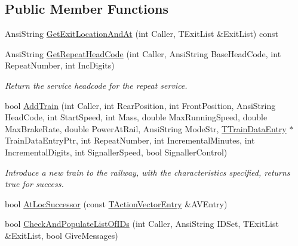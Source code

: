 \subsection*{Public Member Functions}
\begin{DoxyCompactItemize}
\item 
Ansi\+String \mbox{\hyperlink{class_t_train_controller_ae6c904f201d8bb23b3c0714226244890}{Get\+Exit\+Location\+And\+At}} (int Caller, T\+Exit\+List \&Exit\+List) const
\item 
\mbox{\label{class_t_train_controller_afb0e8fd36435809350cb323ab9fe2213}} 
Ansi\+String \mbox{\hyperlink{class_t_train_controller_afb0e8fd36435809350cb323ab9fe2213}{Get\+Repeat\+Head\+Code}} (int Caller, Ansi\+String Base\+Head\+Code, int Repeat\+Number, int Inc\+Digits)
\begin{DoxyCompactList}\small\item\em Return the service headcode for the repeat service. \end{DoxyCompactList}\item 
\mbox{\label{class_t_train_controller_ae9b32534ac7db1c3b0965fc375834132}} 
bool \mbox{\hyperlink{class_t_train_controller_ae9b32534ac7db1c3b0965fc375834132}{Add\+Train}} (int Caller, int Rear\+Position, int Front\+Position, Ansi\+String Head\+Code, int Start\+Speed, int Mass, double Max\+Running\+Speed, double Max\+Brake\+Rate, double Power\+At\+Rail, Ansi\+String Mode\+Str, \mbox{\hyperlink{class_t_train_data_entry}{T\+Train\+Data\+Entry}} $\ast$Train\+Data\+Entry\+Ptr, int Repeat\+Number, int Incremental\+Minutes, int Incremental\+Digits, int Signaller\+Speed, bool Signaller\+Control)
\begin{DoxyCompactList}\small\item\em Introduce a new train to the railway, with the characteristics specified, returns true for success. \end{DoxyCompactList}\item 
bool \mbox{\hyperlink{class_t_train_controller_a7fbe0dc297130da79bcfa3503c6c51c1}{At\+Loc\+Successor}} (const \mbox{\hyperlink{class_t_action_vector_entry}{T\+Action\+Vector\+Entry}} \&A\+V\+Entry)
\item 
bool \mbox{\hyperlink{class_t_train_controller_ae91c1a77699c9daf327938081eab2241}{Check\+And\+Populate\+List\+Of\+I\+Ds}} (int Caller, Ansi\+String I\+D\+Set, T\+Exit\+List \&Exit\+List, bool Give\+Messages)
\item 

\end{DoxyCompactItemize}
